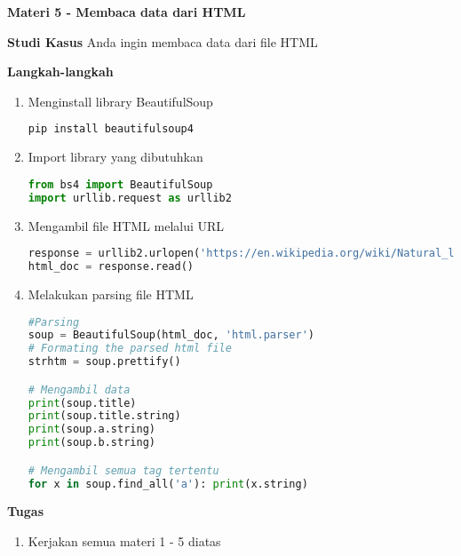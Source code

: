 \documentclass{article}
\begin{document}
    \begin{flushleft}
        \textbf{Materi 5 - Membaca data dari HTML}
        \newline

        \textbf{Studi Kasus}
        \newline
        Anda ingin membaca data dari file HTML
        \newline

        \textbf{Langkah-langkah}

        \begin{enumerate}
            \item Menginstall library BeautifulSoup
            \lstset{style=bashstyle}
            \begin{lstlisting}[language=bash]
pip install beautifulsoup4
            \end{lstlisting}

            \item Import library yang dibutuhkan
            \lstset{style=pythonstyle}
            \begin{lstlisting}[language=python]
from bs4 import BeautifulSoup   
import urllib.request as urllib2
            \end{lstlisting}

            \item Mengambil file HTML melalui URL
            \lstset{style=pythonstyle}
            \begin{lstlisting}[language=python]
response = urllib2.urlopen('https://en.wikipedia.org/wiki/Natural_language_processing')
html_doc = response.read()
            \end{lstlisting}

            \item Melakukan parsing file HTML
            \lstset{style=pythonstyle}
            \begin{lstlisting}[language=python]
#Parsing
soup = BeautifulSoup(html_doc, 'html.parser')
# Formating the parsed html file
strhtm = soup.prettify()

# Mengambil data
print(soup.title)
print(soup.title.string)
print(soup.a.string)
print(soup.b.string)

# Mengambil semua tag tertentu
for x in soup.find_all('a'): print(x.string)
            \end{lstlisting}
        \end{enumerate}
        
    \end{flushleft}

    \newpage
    \begin{flushleft}
        \textbf{Tugas}
        \newline

        \begin{enumerate}
            \item Kerjakan semua materi 1 - 5 diatas
        \end{enumerate}
    \end{flushleft}
\end{document}
